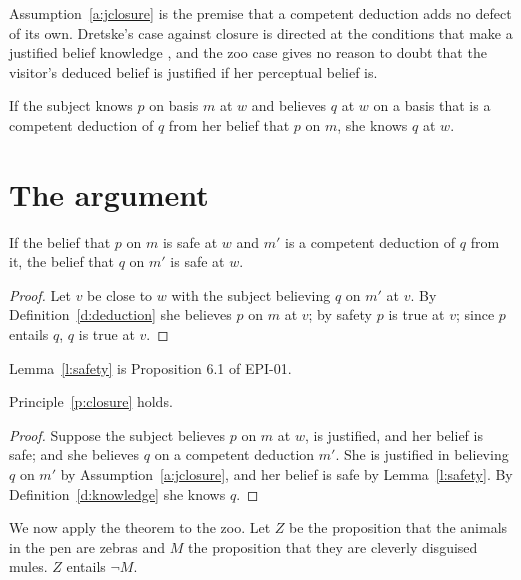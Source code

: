 \documentclass{situationist-preprint}
\begin{document}
Assumption~\ref{a:jclosure} is the premise that a competent deduction adds no defect of its own. Dretske's case against closure is directed at the conditions that make a justified belief knowledge \citep{Dretske2005}, and the zoo case gives no reason to doubt that the visitor's deduced belief is justified if her perceptual belief is.

\begin{principle}[Closure]\label{p:closure}
If the subject knows $p$ on basis $m$ at $w$ and believes $q$ at $w$ on a basis that is a competent deduction of $q$ from her belief that $p$ on $m$, she knows $q$ at $w$.
\end{principle}

\section{The argument}

\begin{lemma}\label{l:safety}
If the belief that $p$ on $m$ is safe at $w$ and $m'$ is a competent deduction of $q$ from it, the belief that $q$ on $m'$ is safe at $w$.
\end{lemma}

\begin{proof}
Let $v$ be close to $w$ with the subject believing $q$ on $m'$ at $v$. By Definition~\ref{d:deduction} she believes $p$ on $m$ at $v$; by safety $p$ is true at $v$; since $p$ entails $q$, $q$ is true at $v$.
\end{proof}

Lemma~\ref{l:safety} is Proposition 6.1 of EPI-01.

\begin{theorem}[Closure]\label{t:closure}
Principle~\ref{p:closure} holds.
\end{theorem}

\begin{proof}
Suppose the subject believes $p$ on $m$ at $w$, is justified, and her belief is safe; and she believes $q$ on a competent deduction $m'$. She is justified in believing $q$ on $m'$ by Assumption~\ref{a:jclosure}, and her belief is safe by Lemma~\ref{l:safety}. By Definition~\ref{d:knowledge} she knows $q$.
\end{proof}

We now apply the theorem to the zoo. Let $Z$ be the proposition that the animals in the pen are zebras and $M$ the proposition that they are cleverly disguised mules. $Z$ entails $\neg M$.
\end{document}
